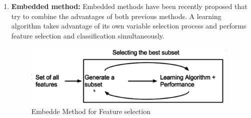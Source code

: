 \documentclass[document.tex]{subfiles}
\begin{document}
\begin{enumerate}
	\item \textbf{Embedded method:} Embedded methods have been recently proposed that try to combine the advantages of both previous methods. A learning algorithm takes advantage of its own variable selection process and performs feature selection and classification simultaneously.
	\begin{figure}[H]
		\begin{center}
			\includegraphics[height=3.0cm]{imgs/embeddedMethod.png}
		\end{center}
		\caption{Embedde Method for Feature selection}
		\label{fig:Embedded Method for Feature selection}
	\end{figure}
\end{enumerate}
\end{document}
